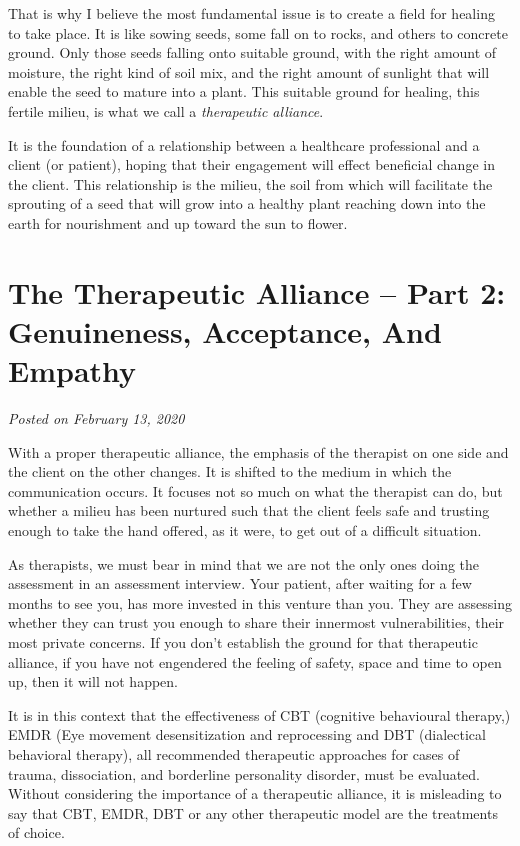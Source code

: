 \documentclass[]{book}
\begin{document}
That is why I believe the most fundamental issue is to create a field for healing to take place. It is like sowing seeds, some fall on to rocks, and others to concrete ground. Only those seeds falling onto suitable ground, with the right amount of moisture, the right kind of soil mix, and the right amount of sunlight that will enable the seed to mature into a plant. This suitable ground for healing, this fertile milieu, is what we call a \emph{therapeutic alliance}.

It is the foundation of a relationship between a healthcare professional and a client (or patient), hoping that their engagement will effect beneficial change in the client. This relationship is the milieu, the soil from which will facilitate the sprouting of a seed that will grow into a healthy plant reaching down into the earth for nourishment and up toward the sun to flower.

\hypertarget{the-therapeutic-alliance-part-2-genuineness-acceptance-and-empathy}{%
\section{The Therapeutic Alliance -- Part 2: Genuineness, Acceptance, And Empathy}\label{the-therapeutic-alliance-part-2-genuineness-acceptance-and-empathy}}

\emph{Posted on February 13, 2020}

With a proper therapeutic alliance, the emphasis of the therapist on one side and the client on the other changes. It is shifted to the medium in which the communication occurs. It focuses not so much on what the therapist can do, but whether a milieu has been nurtured such that the client feels safe and trusting enough to take the hand offered, as it were, to get out of a difficult situation.

As therapists, we must bear in mind that we are not the only ones doing the assessment in an assessment interview. Your patient, after waiting for a few months to see you, has more invested in this venture than you. They are assessing whether they can trust you enough to share their innermost vulnerabilities, their most private concerns. If you don't establish the ground for that therapeutic alliance, if you have not engendered the feeling of safety, space and time to open up, then it will not happen.

It is in this context that the effectiveness of CBT (cognitive behavioural therapy,) EMDR (Eye movement desensitization and reprocessing and DBT (dialectical behavioral therapy), all recommended therapeutic approaches for cases of trauma, dissociation, and borderline personality disorder, must be evaluated. Without considering the importance of a therapeutic alliance, it is misleading to say that CBT, EMDR, DBT or any other therapeutic model are the treatments of choice.
\end{document}

